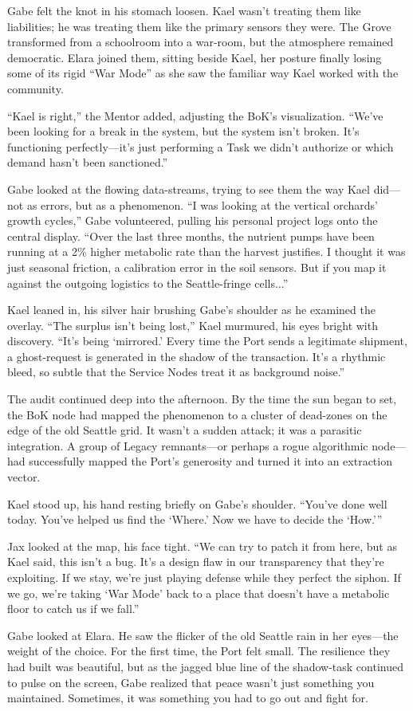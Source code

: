 
Gabe felt the knot in his stomach loosen. Kael wasn't treating them like liabilities; he was treating them like the primary sensors they were. The Grove transformed from a schoolroom into a war-room, but the atmosphere remained democratic. Elara joined them, sitting beside Kael, her posture finally losing some of its rigid ``War Mode'' as she saw the familiar way Kael worked with the community.

``Kael is right,'' the Mentor added, adjusting the BoK's visualization. ``We've been looking for a break in the system, but the system isn't broken. It's functioning perfectly—it's just performing a Task we didn't authorize or which demand hasn't been sanctioned.”

Gabe looked at the flowing data-streams, trying to see them the way Kael did—not as errors, but as a phenomenon. ``I was looking at the vertical orchards' growth cycles,'' Gabe volunteered, pulling his personal project logs onto the central display. ``Over the last three months, the nutrient pumps have been running at a 2\% higher metabolic rate than the harvest justifies. I thought it was just seasonal friction, a calibration error in the soil sensors. But if you map it against the outgoing logistics to the Seattle-fringe cells...''

Kael leaned in, his silver hair brushing Gabe's shoulder as he examined the overlay. ``The surplus isn't being lost,'' Kael murmured, his eyes bright with discovery. ``It's being `mirrored.' Every time the Port sends a legitimate shipment, a ghost-request is generated in the shadow of the transaction. It's a rhythmic bleed, so subtle that the Service Nodes treat it as background noise.''


The audit continued deep into the afternoon. By the time the sun began to set, the BoK node had mapped the phenomenon to a cluster of dead-zones on the edge of the old Seattle grid. It wasn't a sudden attack; it was a parasitic integration. A group of Legacy remnants—or perhaps a rogue algorithmic node—had successfully mapped the Port's generosity and turned it into an extraction vector.

Kael stood up, his hand resting briefly on Gabe's shoulder. ``You've done well today. You've helped us find the `Where.' Now we have to decide the `How.''' 

Jax looked at the map, his face tight. ``We can try to patch it from here, but as Kael said, this isn't a bug. It's a design flaw in our transparency that they're exploiting. If we stay, we're just playing defense while they perfect the siphon. If we go, we're taking `War Mode' back to a place that doesn't have a metabolic floor to catch us if we fall.”

Gabe looked at Elara. He saw the flicker of the old Seattle rain in her eyes—the weight of the choice. For the first time, the Port felt small. The resilience they had built was beautiful, but as the jagged blue line of the shadow-task continued to pulse on the screen, Gabe realized that peace wasn't just something you maintained. Sometimes, it was something you had to go out and fight for.
